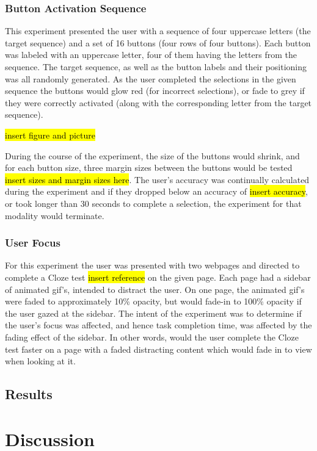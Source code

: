 \documentclass{sigchi}
\begin{document}
\subsubsection{Button Activation Sequence}
This experiment presented the user with a sequence of four uppercase 
letters (the target sequence) and a set of 16 buttons (four rows of 
four buttons). Each button was labeled with an uppercase letter, 
four of them having the letters from the sequence. The target sequence, 
as well as the button labels and their positioning was all randomly 
generated. As the user completed the selections in the given sequence
the buttons would glow red (for incorrect selections), or fade to grey
if they were correctly activated (along with the corresponding 
letter from the target sequence). 

\hl{insert figure and picture}

During the course of the experiment, the size of the buttons would 
shrink, and for each button size, three margin sizes between the buttons
would be tested \hl{insert sizes and margin sizes here}. The user's 
accuracy was continually calculated during the experiment and if they 
dropped below an accuracy of \hl{insert accuracy}, or took longer than
30 seconds to complete a selection, the experiment for that modality 
would terminate.

\subsubsection{User Focus}
For this experiment the user was presented with two webpages and 
directed to complete a Cloze test \hl{insert reference} on the given
page. Each page had a sidebar of animated gif's, intended to distract
the user. On one page, the animated gif's were faded to approximately
10\% opacity, but would fade-in to 100\% opacity if the user gazed at
the sidebar. The intent of the experiment was to determine if the user's
focus was affected, and hence task completion time, was affected by
the fading effect of the sidebar. In other words, would the user complete
the Cloze test faster on a page with a faded distracting content which
would fade in to view when looking at it.


\subsection{Results}



\section{Discussion}
\end{document}
